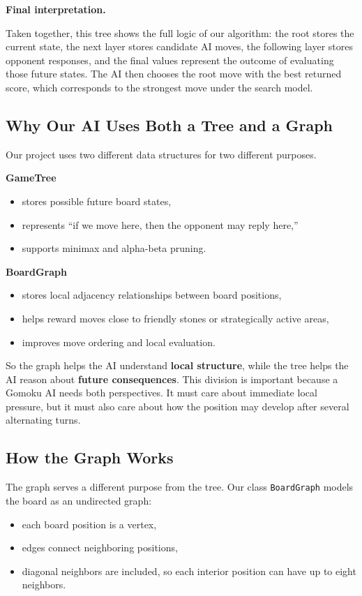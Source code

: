 \documentclass[11pt]{article}
\begin{document}
\noindent
\textbf{Final interpretation.}

Taken together, this tree shows the full logic of our algorithm: the root stores the current state, the next layer stores candidate AI moves, the following layer stores opponent responses, and the final values represent the outcome of evaluating those future states. The AI then chooses the root move with the best returned score, which corresponds to the strongest move under the search model.

\subsection*{Why Our AI Uses Both a Tree and a Graph}

Our project uses two different data structures for two different purposes.

\textbf{GameTree}
\begin{itemize}
    \item stores possible future board states,
    \item represents ``if we move here, then the opponent may reply here,''
    \item supports minimax and alpha-beta pruning.
\end{itemize}

\textbf{BoardGraph}
\begin{itemize}
    \item stores local adjacency relationships between board positions,
    \item helps reward moves close to friendly stones or strategically active areas,
    \item improves move ordering and local evaluation.
\end{itemize}

So the graph helps the AI understand \textbf{local structure}, while the tree helps the AI reason about \textbf{future consequences}. This division is important because a Gomoku AI needs both perspectives. It must care about immediate local pressure, but it must also care about how the position may develop after several alternating turns.

\subsection*{How the Graph Works}

The graph serves a different purpose from the tree. Our class \texttt{BoardGraph} models the board as an undirected graph:
\begin{itemize}
    \item each board position is a vertex,
    \item edges connect neighboring positions,
    \item diagonal neighbors are included, so each interior position can have up to eight neighbors.
\end{itemize}
\end{document}
